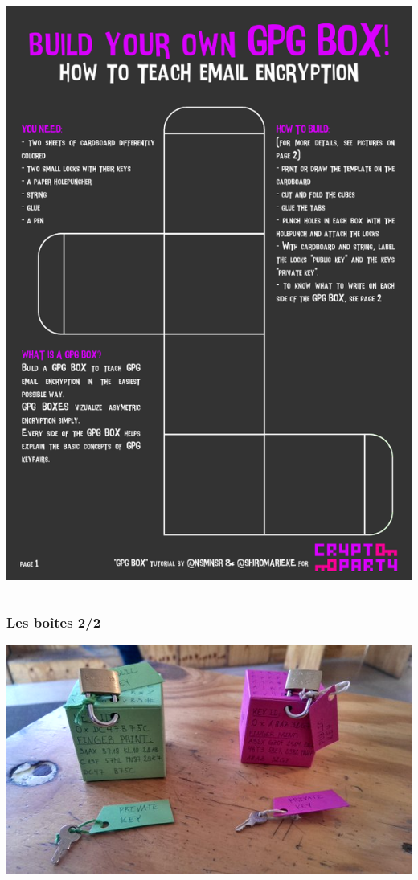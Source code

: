 \documentclass{beamer}
\begin{document}
\begin{frame}
\begin{columns}[c]
\includegraphics[scale=0.28] {./images/GPGBox_03.png}
\end{columns}
\end{frame}

\begin{frame}
\frametitle{Les boîtes 2/2}

\includegraphics[scale=0.65] {./images/GPGBox_01.jpg}
\end{frame}
\end{document}
